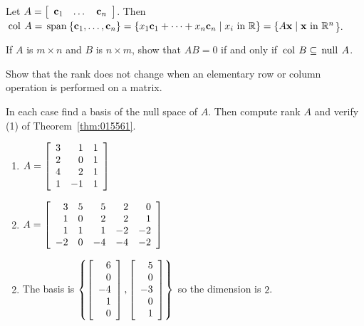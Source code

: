 {{\begin{multicols}{2}
\begin{ex}
\begin{sol}
Let $A = 
\left[ \begin{array}{ccc}
\textbf{c}_{1} & \dots & \textbf{c}_{n}
\end{array} \right]$. Then $\thinspace\operatorname{col\medspace} A = \thinspace\operatorname{span\medspace}\{\textbf{c}_{1}, \dots, \textbf{c}_{n}\} =
\{x_{1}\textbf{c}_{1} + \dots + x_{n}\textbf{c}_{n} \mid x_{i} \mbox{ in }\mathbb{R}\}
= \{A\textbf{x} \mid \textbf{x} \mbox{ in }\mathbb{R}^n$\}.
\end{sol}
\end{ex}

\begin{ex}
If $A$ is $m \times n$ and $B$ is $n \times m$, show that $AB = 0$ if and only if $\thinspace\operatorname{col\medspace} B \subseteq \thinspace\operatorname{null\medspace} A$.
\end{ex}

\begin{ex}
Show that the rank does not change when an elementary row or column operation is performed on a matrix.
\end{ex}

\begin{ex}
In each case find a basis of the null space of $A$. Then compute rank $A$ and verify (1) of Theorem~\ref{thm:015561}.

\begin{enumerate}[label={\alph*.}]
\item 
$A = \left[ \begin{array}{rrr}
3 & 1 & 1 \\
2 & 0 & 1 \\
4 & 2 & 1 \\
1 & -1 & 1
\end{array} \right]$

\item 
$A = \left[ \begin{array}{rrrrr}
3 & 5 & 5 & 2 & 0 \\
1 & 0 & 2 & 2 & 1 \\
1 & 1 & 1 &-2 &-2 \\
-2& 0 &-4 &-4 &-2 \\
\end{array} \right]$

\end{enumerate}
\begin{sol}
\begin{enumerate}[label={\alph*.}]
\setcounter{enumi}{1}
\item The basis is 
$\left\{
\left[ \begin{array}{r}
6\\
0\\
-4\\
1\\
0
\end{array} \right], \left[ \begin{array}{r}
5\\
0\\
-3\\
0\\
1
\end{array} \right]
\right\}$ so the dimension is $2$.


\end{enumerate}
\end{sol}
\end{ex}
\end{multicols}}}
